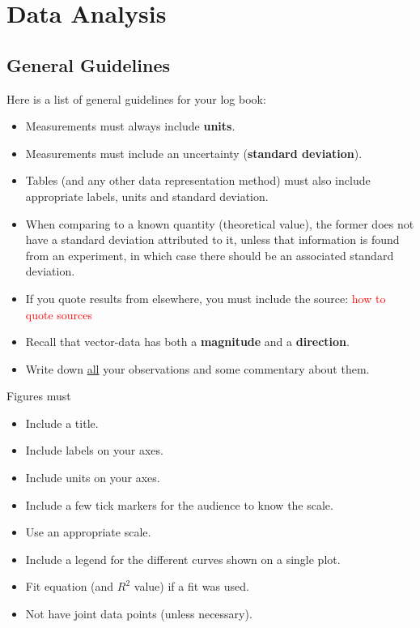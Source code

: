 \documentclass[12pt]{report}
\def \todo #1{\textcolor{red}{#1}}
\begin{document}
{}
\chapter*{Data Analysis}

{}
\section*{General Guidelines}
Here is a list of general guidelines for your log book:
\begin{itemize}
\item Measurements must always include \textbf{units}.
\item Measurements must include an uncertainty (\textbf{standard deviation}).
\item Tables (and any other data representation method) must also include appropriate labels, units and standard deviation.
\item When comparing to a known quantity (theoretical value), the former does not have a standard deviation attributed to it, unless that information is found from an experiment, in which case there should be an associated standard deviation.
\item If you quote results from elsewhere, you must include the source: \todo{how to quote sources}
\item Recall that vector-data has both a \textbf{magnitude} and a \textbf{direction}.
\item Write down \underline{all} your observations and some commentary about them.
\end{itemize}

\noindent Figures must
\begin{itemize}
\item Include a title.
\item Include labels on your axes.
\item Include units on your axes.
\item Include a few tick markers for the audience to know the scale.
\item Use an appropriate scale.
\item Include a legend for the different curves shown on a single plot.
\item Fit equation (and $R^2$ value) if a fit was used.
\item Not have joint data points (unless necessary).
\end{itemize}
\end{document}
